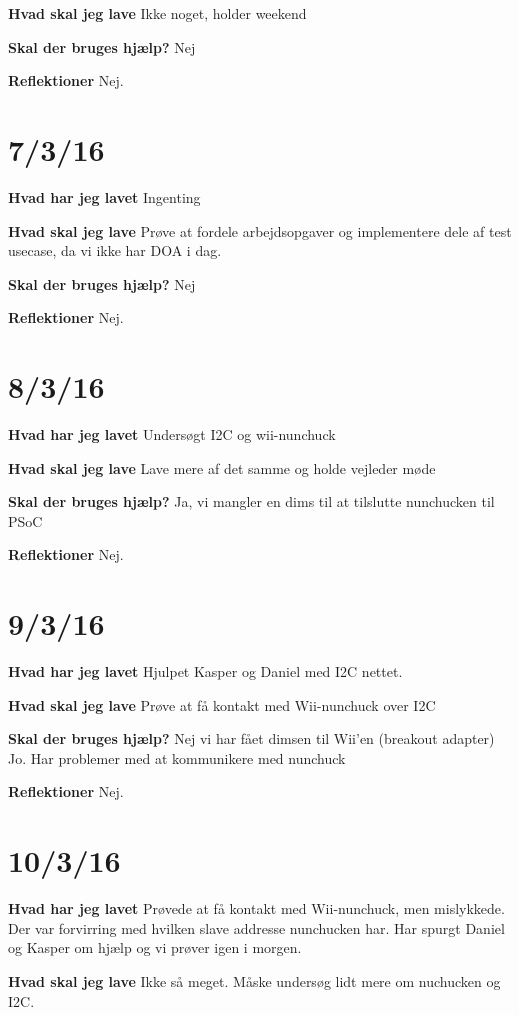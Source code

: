 \documentclass{article}
\begin{document}
	\textbf{Hvad skal jeg lave}
	Ikke noget, holder weekend
	
	\textbf{Skal der bruges hjælp?}
	Nej
	
	\textbf{Reflektioner}
	Nej.	
	
	\section{7/3/16}
	\textbf{Hvad har jeg lavet}
	Ingenting
	
	\textbf{Hvad skal jeg lave}
	Prøve at fordele arbejdsopgaver og implementere dele af test usecase, da vi ikke har DOA i dag.
	
	\textbf{Skal der bruges hjælp?}
	Nej
	
	\textbf{Reflektioner}
	Nej.
	
	\section{8/3/16}
	\textbf{Hvad har jeg lavet}
	Undersøgt I2C og wii-nunchuck 
	
	\textbf{Hvad skal jeg lave}
	Lave mere af det samme og holde vejleder møde
	
	\textbf{Skal der bruges hjælp?}
	Ja, vi mangler en dims til at tilslutte nunchucken til PSoC 
	
	\textbf{Reflektioner}
	Nej.
	
	\section{9/3/16}
	\textbf{Hvad har jeg lavet}
	Hjulpet Kasper og Daniel med I2C nettet. 
	
	\textbf{Hvad skal jeg lave}
	Prøve at få kontakt med Wii-nunchuck over I2C
	
	\textbf{Skal der bruges hjælp?}
	Nej vi har fået dimsen til Wii'en (breakout adapter)
	Jo. Har problemer med at kommunikere med nunchuck
	
	\textbf{Reflektioner}
	Nej.
	
	\section{10/3/16}
	\textbf{Hvad har jeg lavet}
	Prøvede at få kontakt med Wii-nunchuck, men mislykkede. Der var forvirring med hvilken slave addresse nunchucken har. Har spurgt Daniel og Kasper om hjælp og vi prøver igen i morgen.
	
	\textbf{Hvad skal jeg lave}
	Ikke så meget. Måske undersøg lidt mere om nuchucken og I2C.
	
\end{document}
